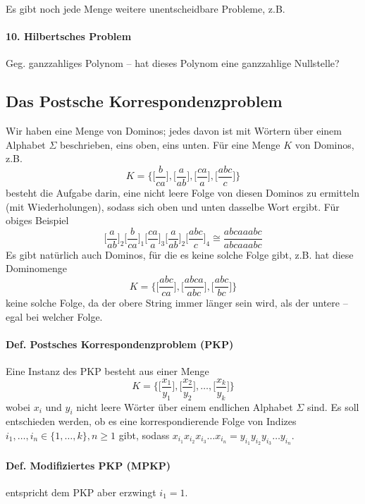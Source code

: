 \para{} Es gibt noch jede Menge weitere unentscheidbare Probleme, z.B.

\paragraph*{10. Hilbertsches Problem} Geg. ganzzahliges Polynom -- hat dieses Polynom eine ganzzahlige Nullstelle?


\subsection{Das Postsche Korrespondenzproblem}


Wir haben eine Menge von Dominos; jedes davon ist mit Wörtern über einem Alphabet $\Sigma$ beschrieben, eins oben, eins unten. Für eine Menge $K$ von Dominos, z.B. $$ K=\Bigg\{ \Bigg[\frac{b}{ca}\Bigg], \Bigg[\frac{a}{ab}\Bigg], \Bigg[\frac{ca}{a}\Bigg], \Bigg[\frac{abc}{c}\Bigg] \Bigg\} $$ besteht die Aufgabe darin, eine nicht leere Folge von diesen Dominos zu ermitteln (mit Wiederholungen), sodass sich oben und unten dasselbe Wort ergibt. Für obiges Beispiel $$ \Bigg[\frac{a}{ab}\Bigg]_2 \Bigg[\frac{b}{ca}\Bigg]_1 \Bigg[\frac{ca}{a}\Bigg]_3 \Bigg[\frac{a}{ab}\Bigg]_2 \Bigg[\frac{abc}{c}\Bigg]_4 \cong \frac{abcaaabc}{abcaaabc} $$
Es gibt natürlich auch Dominos, für die es keine solche Folge gibt, z.B. hat diese Dominomenge $$ K=\Bigg\{ \Bigg[\frac{abc}{ca}\Bigg], \Bigg[\frac{abca}{abc}\Bigg], \Bigg[\frac{abc}{bc}\Bigg] \Bigg\} $$ keine solche Folge, da der obere String immer länger sein wird, als der untere -- egal bei welcher Folge.

\paragraph*{Def. Postsches Korrespondenzproblem (PKP)} Eine Instanz des PKP besteht aus einer Menge $$ K=\Bigg\{ \Bigg[\frac{x_1}{y_1}\Bigg], \Bigg[\frac{x_2}{y_2}\Bigg], \dots, \Bigg[\frac{x_k}{y_k}\Bigg] \Bigg\} $$ wobei $x_i$ und $y_i$ nicht leere Wörter über einem endlichen Alphabet $\Sigma$ sind. Es soll entschieden werden, ob es eine korrespondierende Folge von Indizes $i_1,\dots,i_n \in \{ 1,\dots,k \}, n \geq 1$ gibt, sodass $x_{i_1}x_{i_2}x_{i_3}\dots x_{i_n} = y_{i_1}y_{i_2}y_{i_3}\dots y_{i_n}$.

\paragraph*{Def. Modifiziertes PKP (MPKP)} entspricht dem PKP aber erzwingt $i_1 = 1$.

